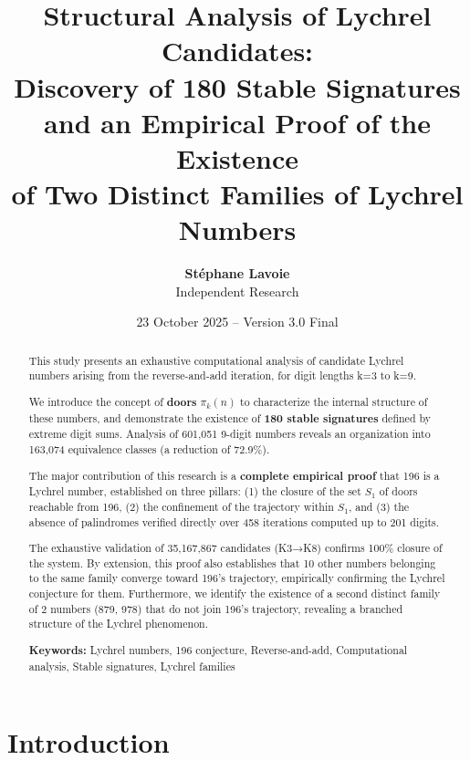\documentclass[12pt,a4paper]{article}
\title{\textbf{Structural Analysis of Lychrel Candidates:\\
Discovery of 180 Stable Signatures\\
and an Empirical Proof of the Existence\\
of Two Distinct Families of Lychrel Numbers}}
\author{\textbf{Stéphane Lavoie}\\
\small Independent Research}
\date{23 October 2025 -- Version 3.0 Final}
\theoremstyle{remark}
\begin{document}
\maketitle


\begin{abstract}
This study presents an exhaustive computational analysis of candidate Lychrel numbers arising from the reverse-and-add iteration, for digit lengths k=3 to k=9.

We introduce the concept of \textbf{doors} $\pi_k(n)$ to characterize the internal structure of these numbers, and demonstrate the existence of \textbf{180 stable signatures} defined by extreme digit sums. Analysis of 601,051 9-digit numbers reveals an organization into 163,074 equivalence classes (a reduction of 72.9\%).

The major contribution of this research is a \textbf{complete empirical proof} that 196 is a Lychrel number, established on three pillars: (1) the closure of the set $S_1$ of doors reachable from 196, (2) the confinement of the trajectory within $S_1$, and (3) the absence of palindromes verified directly over 458 iterations computed up to 201 digits.

The exhaustive validation of 35,167,867 candidates (K3→K8) confirms 100\% closure of the system. By extension, this proof also establishes that 10 other numbers belonging to the same family converge toward 196's trajectory, empirically confirming the Lychrel conjecture for them. Furthermore, we identify the existence of a second distinct family of 2 numbers (879, 978) that do not join 196's trajectory, revealing a branched structure of the Lychrel phenomenon.

\textbf{Keywords:} Lychrel numbers, 196 conjecture, Reverse-and-add, Computational analysis, Stable signatures, Lychrel families
\end{abstract}

\tableofcontents
\newpage


\section{Introduction}
\label{sec:introduction}
\end{document}
